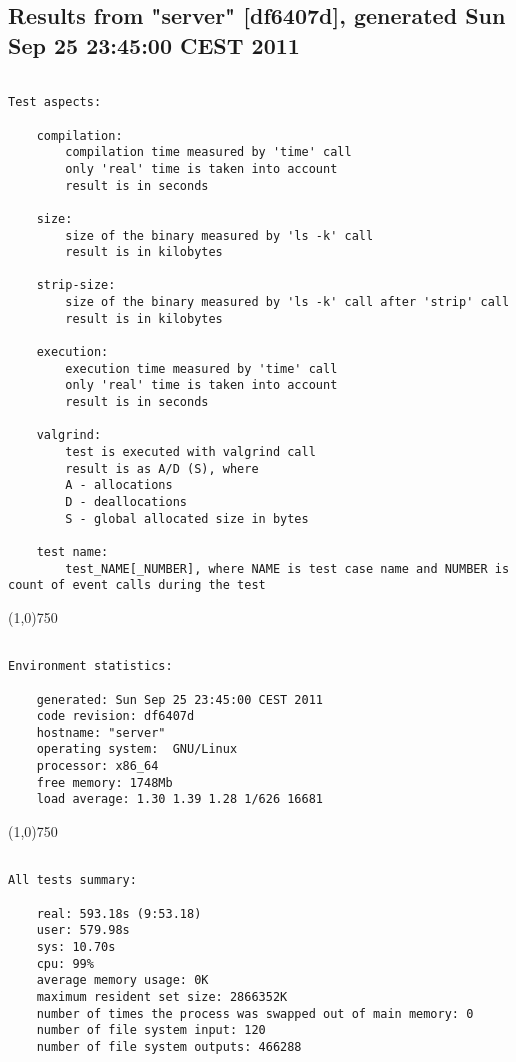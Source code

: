 \clearpage
\subsection{Results from "server" [df6407d], generated Sun Sep 25 23:45:00 CEST 2011}
\begin{verbatim}

Test aspects:

    compilation:
        compilation time measured by 'time' call
        only 'real' time is taken into account
        result is in seconds

    size:
        size of the binary measured by 'ls -k' call
        result is in kilobytes

    strip-size:
        size of the binary measured by 'ls -k' call after 'strip' call
        result is in kilobytes

    execution:
        execution time measured by 'time' call
        only 'real' time is taken into account
        result is in seconds

    valgrind:
        test is executed with valgrind call
        result is as A/D (S), where
        A - allocations
        D - deallocations
        S - global allocated size in bytes

    test name:
        test_NAME[_NUMBER], where NAME is test case name and NUMBER is count of event calls during the test
\end{verbatim}
\begin{center}
\line(1,0){750}
\end{center}
\begin{verbatim}

Environment statistics:

    generated: Sun Sep 25 23:45:00 CEST 2011
    code revision: df6407d
    hostname: "server"
    operating system:  GNU/Linux
    processor: x86_64
    free memory: 1748Mb
    load average: 1.30 1.39 1.28 1/626 16681

\end{verbatim}
\begin{center}
\line(1,0){750}
\end{center}
\begin{verbatim}

All tests summary:

    real: 593.18s (9:53.18)
    user: 579.98s
    sys: 10.70s
    cpu: 99%
    average memory usage: 0K
    maximum resident set size: 2866352K
    number of times the process was swapped out of main memory: 0
    number of file system input: 120
    number of file system outputs: 466288
\end{verbatim}
